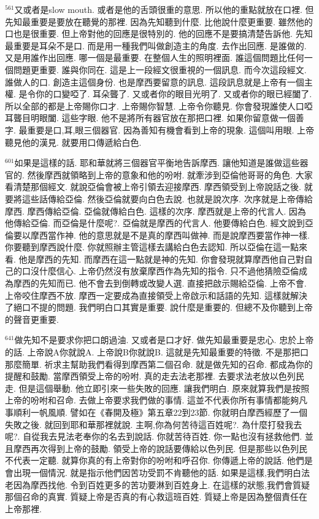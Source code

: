 \documentclass{book}
\begin{document}
$^{561}$又或者是slow mouth.
或者是他的舌頭很重的意思.
所以他的重點就放在口裡.
但先知最重要是要放在聽覺的那裡.
因為先知聽到什麼.
比他說什麼更重要.
雖然他的口也是很重要.
但上帝對他的回應是很特別的.
他的回應不是要搞清楚告訴他.
先知最重要是耳朵不是口.
而是用一種我們叫做創造主的角度.
去作出回應.
是誰做的.
又是用誰作出回應.
哪一個是最重要.
在整個人生的照明裡面.
誰這個問題比任何一個問題更重要.
誰與你同在.
這是上一段經文很重視的一個訊息.
而今次這段經文.
誰做人的口.
創造主這個身份.
也是摩西要留意的訊息.
這段訊息就是上帝有一個主權.
是令你的口變啞了.
耳朵聾了.
又或者你的眼目光明了.
又或者你的眼已經闔了.
所以全部的都是上帝賜你口才.
上帝賜你智慧.
上帝令你聽見.
你會發現誰使人口啞耳聾目明眼闔.
這些字眼.
他不是將所有器官放在那把口裡.
如果你留意做一個善字.
最重要是口,耳,眼三個器官.
因為善知有機會看到上帝的現象.
這個叫用眼.
上帝聽見他的漢見.
就要用口傳遞給白色.

$^{601}$如果是這樣的話.
耶和華就將三個器官平衡地告訴摩西.
讓他知道是誰做這些器官的.
然後摩西就領略到上帝的意象和他的吩咐.
就牽涉到亞倫他哥哥的角色.
大家看清楚那個經文.
就說亞倫會被上帝引領去迎接摩西.
摩西領受到上帝說話之後.
就要將這些話傳給亞倫.
然後亞倫就要向白色去說.
也就是說次序.
次序就是上帝傳給摩西.
摩西傳給亞倫.
亞倫就傳給白色.
這樣的次序.
摩西就是上帝的代言人.
因為他傳給亞倫.
而亞倫是什麼呢?.
亞倫就是摩西的代言人.
他要傳給白色.
經文說到亞倫要以摩西當作神.
他的意思就是不是真的摩西叫做神.
而是說摩西要當作神一樣.
你要聽到摩西說什麼.
你就照辦主管這樣去講給白色去認知.
所以亞倫在這一點來看.
他是摩西的先知.
而摩西在這一點就是神的先知.
你會發現就算摩西他自己對自己的口沒什麼信心.
上帝仍然沒有放棄摩西作為先知的指令.
只不過他猜險亞倫成為摩西的先知而已.
他不會去到倒轉或改變人選.
直接把啟示賜給亞倫.
上帝不會.
上帝咬住摩西不放.
摩西一定要成為直接領受上帝啟示和話語的先知.
這樣就解決了絕口不提的問題.
我們明白口其實是重要.
說什麼是重要的.
但總不及你聽到上帝的聲音更重要.

$^{641}$做先知不是要求你把口朗過油.
又或者是口才好.
做先知最重要是忠心.
忠於上帝的話.
上帝說A你就說A.
上帝說B你就說B.
這就是先知最重要的特徵.
不是那把口那麼簡單.
祈求主幫助我們看得到摩西第二個召命.
就是做先知的召命.
都成為你的提醒和鼓勵.
當摩西領受上帝的吩咐.
真的走去法老那裡.
去要求法老放以色列民走.
但是這個舉動.
他立即引來一些失敗的回應.
讓我們明白.
原來就算我們是按照上帝的吩咐和召命.
去做上帝要求我們做的事情.
這並不代表你所有事情都能夠凡事順利一帆風順.
譬如在《春開及極》第五章22到23節.
你就明白摩西經歷了一個失敗之後.
就回到耶和華那裡就說.
主啊,你為何苦待這百姓呢?.
為什麼打發我去呢?.
自從我去見法老奉你的名去到說話.
你就苦待百姓.
你一點也沒有拯救他們.
並且摩西再次得到上帝的鼓勵.
領受上帝的說話要傳給以色列民.
但是那些以色列民不代表一定聽.
就算你真的有上帝對你的吩咐和呼召你.
你傳遞上帝的說話.
他們是會出現一個情況.
就是指示他們因苦功受罰不肯聽他的話.
如果是這樣,我們明白法老因為摩西找他.
令到百姓更多的苦功要淋到百姓身上.
在這樣的狀態,我們會質疑那個召命的真實.
質疑上帝是否真的有心救這班百姓.
質疑上帝是因為整個責任在上帝那裡.
\end{document}
